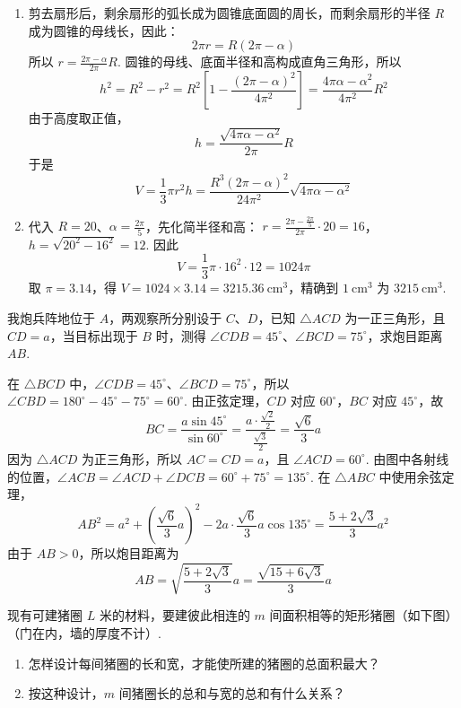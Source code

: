 \begin{solution}
\begin{enumerate}
\item 剪去扇形后，剩余扇形的弧长成为圆锥底面圆的周长，而剩余扇形的半径 \(R\) 成为圆锥的母线长，因此：
\[
2\pi r=R\left( 2\pi-\alpha \right)
\]
所以 \(r=\frac{2\pi-\alpha}{2\pi}R\).
圆锥的母线、底面半径和高构成直角三角形，所以
\[
h^2=R^2-r^2=R^2\left[1-\frac{\left( 2\pi-\alpha \right)^2}{4\pi^2}\right]=\frac{4\pi\alpha-\alpha^2}{4\pi^2}R^2
\]
由于高度取正值，
\[
h=\frac{\sqrt{4\pi\alpha-\alpha^2}}{2\pi}R
\]
于是
\[
V=\frac13\pi r^2h=\frac{R^3\left( 2\pi-\alpha \right)^2}{24\pi^2}\sqrt{4\pi\alpha-\alpha^2}
\]
\item 代入 \(R=20\)、\(\alpha=\frac{2\pi}{5}\)，先化简半径和高：
\(r=\frac{2\pi-\frac{2\pi}{5}}{2\pi}\cdot20=16\)，\(h=\sqrt{20^2-16^2}=12\).
因此
\[
V=\frac13\pi\cdot16^2\cdot12=1024\pi
\]
取 \(\pi=3.14\)，得 \(V=1024\times3.14=3215.36\mathrm{~cm^3}\)，精确到 \(1\mathrm{~cm^3}\) 为 \(3215\mathrm{~cm^3}\).
\end{enumerate}
\end{solution}

\begin{problem}
我炮兵阵地位于 \(A\)，两观察所分别设于 \(C\)、\(D\)，已知 \(\triangle ACD\) 为一正三角形，且 \(CD=a\)，当目标出现于 \(B\) 时，测得 \(\angle CDB=45^\circ\)、\(\angle BCD=75^\circ\)，求炮目距离 \(AB\).

\end{problem}

\begin{solution}
在 \(\triangle BCD\) 中，\(\angle CDB=45^\circ\)、\(\angle BCD=75^\circ\)，所以
\(\angle CBD=180^\circ-45^\circ-75^\circ=60^\circ\). 由正弦定理，\(CD\) 对应 \(60^\circ\)，\(BC\) 对应 \(45^\circ\)，故
\[
BC=\frac{a\sin45^\circ}{\sin60^\circ}=\frac{a\cdot\frac{\sqrt2}{2}}{\frac{\sqrt3}{2}}=\frac{\sqrt6}{3}a
\]
因为 \(\triangle ACD\) 为正三角形，所以 \(AC=CD=a\)，且 \(\angle ACD=60^\circ\). 由图中各射线的位置，\(\angle ACB=\angle ACD+\angle DCB=60^\circ+75^\circ=135^\circ\). 在 \(\triangle ABC\) 中使用余弦定理，
\[
AB^2=a^2+\left(\frac{\sqrt6}{3}a\right)^2-2a\cdot\frac{\sqrt6}{3}a\cos135^\circ=\frac{5+2\sqrt3}{3}a^2
\]
由于 \(AB>0\)，所以炮目距离为
\[
AB=\sqrt{\frac{5+2\sqrt3}{3}}a=\frac{\sqrt{15+6\sqrt3}}{3}a
\]
\end{solution}

\begin{problem}
现有可建猪圈 \(L\) 米的材料，要建彼此相连的 \(m\) 间面积相等的矩形猪圈（如下图）（门在内，墙的厚度不计）.

\begin{enumerate}
\item 怎样设计每间猪圈的长和宽，才能使所建的猪圈的总面积最大？
\item 按这种设计，\(m\) 间猪圈长的总和与宽的总和有什么关系？
\end{enumerate}

\end{problem}

